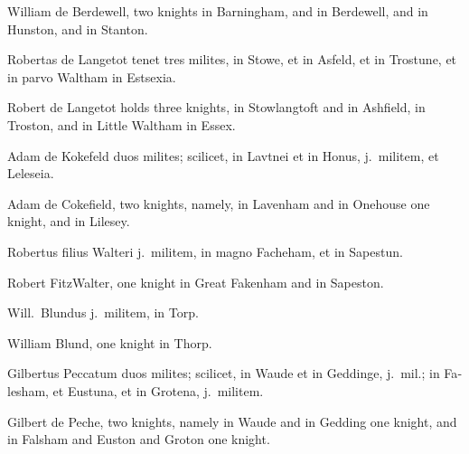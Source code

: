 \documentclass{book}
\begin{document}
\begin{paracol}{2}
\switchcolumn

William de Berdewell, two knights in Barningham, and in Berdewell, and in Hunston, and in Stanton.

\switchcolumn*

\begin{otherlanguage}{latin}
Robertas de Langetot tenet tres milites, in Stowe, et in Asfeld, et in Trostune, et in parvo Waltham in Estsexia.
\end{otherlanguage}

\switchcolumn

Robert de Langetot holds three knights, in Stowlangtoft and in Ashfield, in Troston, and in Little Waltham in Essex.

\switchcolumn*

\begin{otherlanguage}{latin}
Adam de Kokefeld duos milites; scilicet, in Lavtnei et in Honus, j.\ militem, et Leleseia.
\end{otherlanguage}

\switchcolumn

Adam de Cokefield, two knights, namely, in Lavenham and in Onehouse one knight, and in Lilesey.

\switchcolumn*

\begin{otherlanguage}{latin}
Robertus filius Walteri j.\ militem, in magno Facheham, et in Sapestun.
\end{otherlanguage}

\switchcolumn

Robert FitzWalter, one knight in Great Fakenham and in Sapeston.

\switchcolumn*

\begin{otherlanguage}{latin}
Will.\ Blundus j.\ militem, in Torp.
\end{otherlanguage}

\switchcolumn

William Blund, one knight in Thorp.

\switchcolumn*

\begin{otherlanguage}{latin}
Gilbertus Peccatum duos milites; scilicet, in Waude et in Geddinge, j.\ mil.; in Falesham, et Eustuna, et in Grotena, j.\ militem.
\end{otherlanguage}

\switchcolumn

Gilbert de Peche, two knights, namely in Waude and in Gedding one knight, and in Falsham and Euston and Groton one knight.


\end{paracol}
\end{document}
